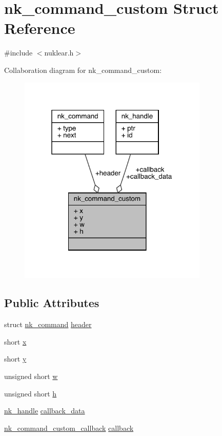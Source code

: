 \hypertarget{structnk__command__custom}{}\section{nk\+\_\+command\+\_\+custom Struct Reference}
\label{structnk__command__custom}


{\ttfamily \#include $<$nuklear.\+h$>$}



Collaboration diagram for nk\+\_\+command\+\_\+custom\+:
\nopagebreak
\begin{figure}[H]
\begin{center}
\leavevmode
\includegraphics[width=256pt]{structnk__command__custom__coll__graph}
\end{center}
\end{figure}
\subsection*{Public Attributes}
\begin{DoxyCompactItemize}
\item 
struct \mbox{\hyperlink{structnk__command}{nk\+\_\+command}} \mbox{\hyperlink{structnk__command__custom_a2694ddc1418ae575b1f2a594327a113a}{header}}
\item 
short \mbox{\hyperlink{structnk__command__custom_a847207902e09d1aa6dc974fc226c463b}{x}}
\item 
short \mbox{\hyperlink{structnk__command__custom_a11a17cf05108285041473a0b44c81154}{y}}
\item 
unsigned short \mbox{\hyperlink{structnk__command__custom_a13aad7adc5361402e2f375bde35c6cae}{w}}
\item 
unsigned short \mbox{\hyperlink{structnk__command__custom_aeeef97c98b0b23de526713fcb88fb536}{h}}
\item 
\mbox{\hyperlink{unionnk__handle}{nk\+\_\+handle}} \mbox{\hyperlink{structnk__command__custom_ae4d6bed7d6f565ecf799ad64e06be834}{callback\+\_\+data}}
\item 
\mbox{\hyperlink{nuklear_8h_a31909395d6066c8b4a31d1a371816a37}{nk\+\_\+command\+\_\+custom\+\_\+callback}} \mbox{\hyperlink{structnk__command__custom_ada2427e791d8e1d96264f9873b1d5e08}{callback}}
\end{DoxyCompactItemize}


